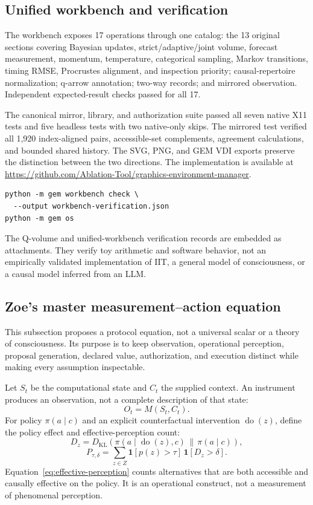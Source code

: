 \documentclass[11pt,a4paper]{article}
\begin{document}
\subsection{Unified workbench and verification}
The workbench exposes 17 operations through one catalog: the 13 original sections covering Bayesian updates, strict/adaptive/joint volume, forecast measurement, momentum, temperature, categorical sampling, Markov transitions, timing RMSE, Procrustes alignment, and inspection priority; causal-repertoire normalization; q-arrow annotation; two-way records; and mirrored observation. Independent expected-result checks passed for all 17.

The canonical mirror, library, and authorization suite passed all seven native X11 tests and five headless tests with two native-only skips. The mirrored test verified all 1,920 index-aligned pairs, accessible-set complements, agreement calculations, and bounded shared history. The SVG, PNG, and GEM VDI exports preserve the distinction between the two directions. The implementation is available at \url{https://github.com/Ablation-Tool/graphics-environment-manager}.

\begin{lstlisting}
python -m gem workbench check \
  --output workbench-verification.json
python -m gem os
\end{lstlisting}

The Q-volume and unified-workbench verification records are embedded as attachments. They verify toy arithmetic and software behavior, not an empirically validated implementation of IIT, a general model of consciousness, or a causal model inferred from an LLM.

\subsection{Zoe's master measurement--action equation}
This subsection proposes a protocol equation, not a universal scalar or a theory of consciousness. Its purpose is to keep observation, operational perception, proposal generation, declared value, authorization, and execution distinct while making every assumption inspectable.

Let $S_t$ be the computational state and $C_t$ the supplied context. An instrument produces an observation, not a complete description of that state:
\begin{equation}
O_t=M(S_t,C_t).
\end{equation}
For policy $\pi(a\mid c)$ and an explicit counterfactual intervention $\operatorname{do}(z)$, define the policy effect and effective-perception count:
\begin{equation}
D_z=D_{\mathrm{KL}}\!\left(\pi(a\mid\operatorname{do}(z),c)\,\middle\|\,\pi(a\mid c)\right),
\end{equation}
\begin{equation}
P_{\tau,\delta}=\sum_{z\in Z}\mathbf 1[p(z)>\tau]\,\mathbf 1[D_z>\delta].
\label{eq:effective-perception}
\end{equation}
Equation~\ref{eq:effective-perception} counts alternatives that are both accessible and causally effective on the policy. It is an operational construct, not a measurement of phenomenal perception.
\end{document}
